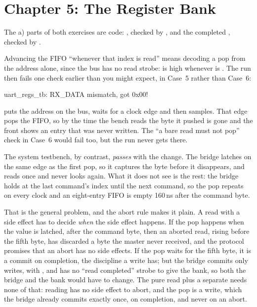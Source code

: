 
\section{Chapter 5: The Register Bank}
\label{sol:c5}
The a) parts of both exercises are code: , checked by , and the
completed , checked by .

 Advancing the FIFO ``whenever that index is read'' means decoding a pop from the address
alone, since the bus has no read strobe:  is high whenever  is
. The run then fails one check earlier than you might expect, in Case~5 rather
than Case~6:

\begin{console}
uart_regs_tb: RX_DATA mismatch, got 0x00!
\end{console}

\noindent {} puts the address on the bus, waits for a clock edge and then samples.
That edge pops the FIFO, so by the time the bench reads  the byte it pushed is gone
and the front shows an entry that was never written. The ``a bare  read must not pop''
check in Case~6 would fail too, but the run never gets there.

The system testbench, by contrast, \emph{passes} with the change. The bridge latches
 on the same edge as the first pop, so it captures the byte before it disappears,
and  reads  once and never looks again. What it does not see is the
rest: the bridge holds  at the last command's index until the next command, so the
pop repeats on every clock and an eight-entry FIFO is empty 160\,ns after the command byte.

That is the general problem, and the abort rule makes it plain. A read with a side effect has to
decide \emph{when} the side effect happens. If the pop happens when the value is latched, after the
command byte, then an aborted read,  rising before the fifth byte, has discarded a byte the
master never received, and the protocol promises that an abort has no side effects. If the pop waits
for the fifth byte, it is a commit on completion, the discipline a write has; but the bridge commits
only writes, with , and has no ``read completed'' strobe to give the bank, so both
the bridge and the bank would have to change. The pure read plus a separate  needs
none of that: reading has no side effect to abort, and the pop is a write, which the bridge already
commits exactly once, on completion, and never on an abort.

